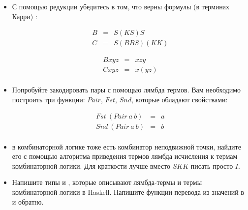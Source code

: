 \begin{itemize}
\item С помощью редукции убедитесь в том, что верны формулы
(в терминах Карри) :

\begin{eqnarray*}
B &=& S(KS)S \\
C &=& S(BBS)(KK)
\end{eqnarray*}

\begin{eqnarray*}
Bxyz &=& xzy \\
Cxyz &=& x(yz) \\
\end{eqnarray*}



\item Попробуйте закодировать пары с помощью лямбда термов.
    Вам необходимо построить три функции: $Pair$, $Fst$, $Snd$,
    которые обладают свойствами:

\begin{eqnarray*}
     Fst\ (Pair\ a\ b) &=& a \\
     Snd\ (Pair\ a\ b) &=& b \\
\end{eqnarray*}

\item в комбинаторной логике тоже есть комбинатор неподвижной
    точки, найдите его с помощью алгоритма приведения термов
    лямбда исчисления к термам комбинаторной логики.
    Для краткости лучше вместо $SKK$ писать просто $I$.

\item Напишите типы  и , которые описывают
    лямбда-термы и термы комбинаторной логики в Haskell. 
    Напишите функции перевода из значений  в 
    и обратно.

\end{itemize}

